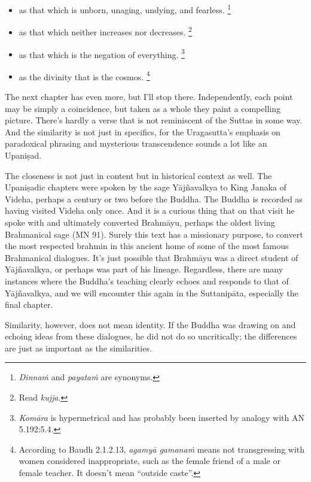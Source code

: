 \documentclass[12pt,openany]{book}%
\begin{document}
\begin{itemize}
\begin{itemize}%
\item as that which is unborn, unaging, undying, and fearless. \footnote{\textit{\textsanskrit{Dinnaṁ}} and \textit{\textsanskrit{payataṁ}} are synonyms. }%
\item as that which neither increases nor decreases. \footnote{Read \textit{kujja}. }%
\item as that which is the negation of everything. \footnote{\textit{\textsanskrit{Komāra}} is hypermetrical and has probably been inserted by analogy with AN 5.192:5.4. }%
\item as the divinity that is the cosmos. \footnote{According to Baudh 2.1.2.13, \textit{\textsanskrit{agamyā} \textsanskrit{gamanaṁ}} means not transgressing with women considered inappropriate, such as the female friend of a male or female teacher. It doesn’t mean “outside caste”. }%
\end{itemize}

%
\end{itemize}

The next chapter has even more, but I’ll stop there. Independently, each point may be simply a coincidence, but taken as a whole they paint a compelling picture. There’s hardly a verse that is not reminiscent of the Suttas in some way. And the similarity is not just in specifics, for the Uragasutta’s emphasis on paradoxical phrasing and mysterious transcendence sounds a lot like an \textsanskrit{Upaniṣad}.

The closeness is not just in content but in historical context as well. The \textsanskrit{Upaniṣadic} chapters were spoken by the sage \textsanskrit{Yājñavalkya} to King Janaka of Videha, perhaps a century or two before the Buddha. The Buddha is recorded as having visited Videha only once. And it is a curious thing that on that visit he spoke with and ultimately converted \textsanskrit{Brahmāyu}, perhaps the oldest living Brahmanical sage (MN 91). Surely this text has a missionary purpose, to convert the most respected brahmin in this ancient home of some of the most famous Brahmanical dialogues. It’s just possible that \textsanskrit{Brahmāyu} was a direct student of \textsanskrit{Yājñavalkya}, or perhaps was part of his lineage. Regardless, there are many instances where the Buddha’s teaching clearly echoes and responds to that of \textsanskrit{Yājñavalkya}, and we will encounter this again in the \textsanskrit{Suttanipāta}, especially the final chapter.

Similarity, however, does not mean identity. If the Buddha was drawing on and echoing ideas from these dialogues, he did not do so uncritically; the differences are just as important as the similarities.
\end{document}
